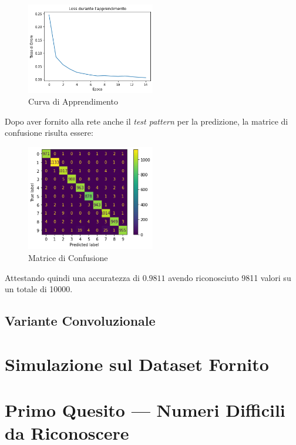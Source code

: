 \documentclass[12pt, a4paper]{article}
\begin{document}
\begin{figure}[h]
    \centering
    \includegraphics[width=0.50\textwidth]{CurvaApprendimentoClassica}
    \caption{Curva di Apprendimento}
\end{figure}

Dopo aver fornito alla rete anche il \textit{test pattern} per la predizione, la matrice di confusione risulta essere:

\begin{figure}[h]
    \centering
    \includegraphics[width=0.50\textwidth]{MatriceConfusioneClassica}
    \caption{Matrice di Confusione}
\end{figure}

Attestando quindi una accuratezza di \(0.9811\) avendo riconosciuto 9811 valori su un totale di 10000.


\subsection{Variante Convoluzionale}

\newpage
\section{Simulazione sul Dataset Fornito}

\newpage
\section{Primo Quesito --- Numeri Difficili da Riconoscere}
\end{document}
